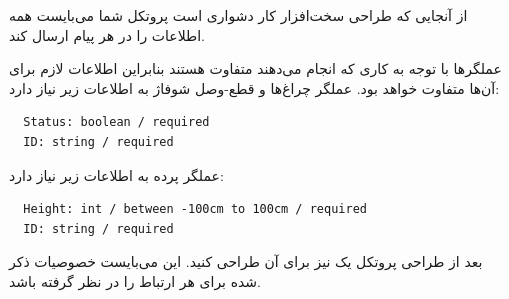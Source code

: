 \documentclass[../main.tex]{subfiles}
\begin{document}
از آنجایی که طراحی سخت‌افزار کار دشواری است پروتکل شما می‌بایست همه اطلاعات را در هر پیام ارسال کند.

عملگرها با توجه به کاری که انجام می‌دهند متفاوت هستند بنابراین اطلاعات لازم برای آن‌ها متفاوت خواهد بود.
عملگر چراغ‌ها و قطع-وصل شوفاژ به اطلاعات زیر نیاز دارد:

\begin{latin}
\begin{lstlisting}
  Status: boolean / required
  ID: string / required
\end{lstlisting}
\end{latin}

عملگر پرده به اطلاعات زیر نیاز دارد:

\begin{latin}
\begin{lstlisting}
  Height: int / between -100cm to 100cm / required
  ID: string / required
\end{lstlisting}
\end{latin}

بعد از طراحی پروتکل یک  نیز برای آن طراحی کنید.
این  می‌بایست خصوصیات ذکر شده برای هر ارتباط را در نظر گرفته باشد.
\end{document}
